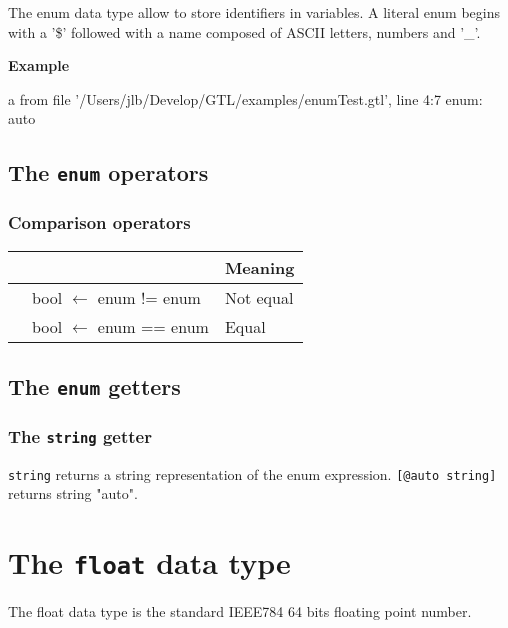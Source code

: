 \documentclass[10pt,openright,twosides,final]{memoir}
\newcommand{\gtltype}[1]{{\small\ttfamily #1}}
\newcommand{\ccst}[1]{{\footnotesize\ttfamily\colorbox{light-blue}{'#1'}}}
\newcommand{\scst}[1]{{\footnotesize\ttfamily\colorbox{light-blue}{"#1"}}}
\newcommand{\gtlinline}[1]{\colorbox{light-blue}{\lstinline[language=gtl]{#1}}}
\newcommand{\example}{\vspace{.75em}\noindent\textbf{Example}\vspace{0em}}
\begin{document}
The \gtltype{enum} data type allow to store identifiers in variables. A literal enum begins with a \ccst{\$} followed with a name composed of ASCII letters, numbers and \ccst{\_}.

\example
{}
\begin{console}
a from file '/Users/jlb/Develop/GTL/examples/enumTest.gtl', line 4:7
    enum: auto
\end{console}

\subsection{The \texttt{enum} operators}

\subsubsection{Comparison operators}

\begin{longtable}{>{\ttfamily}l|>{\ttfamily}l|l}
{\bfseries Operator}&{\bfseries Expression type}&{\bfseries Meaning}\\
\hline\endhead
 {!=}&
  {bool $\leftarrow$ enum != enum}&
  {Not equal}\\
 {==}&
  {bool $\leftarrow$ enum == enum}&
  {Equal}\\
\end{longtable}

\subsection{The \texttt{enum} getters}

\subsubsection{The \texttt{string} getter}

\gtlinline{string} returns a string representation of the enum expression. \gtlinline{[@auto string]} returns string \scst{auto}.

\section{The \texttt{float} data type}

The \gtltype{float} data type is the standard IEEE784 64 bits floating point number.
\end{document}
